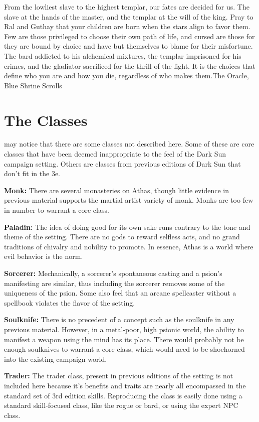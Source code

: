{From the lowliest slave to the highest templar, our fates are decided for us. The slave at the hands of the master, and the templar at the will of the king. Pray to Ral and Guthay that your children are born when the stars align to favor them. Few are those privileged to choose their own path of life, and cursed are those for they are bound by choice and have but themselves to blame for their misfortune. The bard addicted to his alchemical mixtures, the templar imprisoned for his crimes, and the gladiator sacrificed for the thrill of the fight. It is the choices that define who you are and how you die, regardless of who makes them.}{The Oracle, Blue Shrine Scrolls}

\section{The Classes}
 may notice that there are some classes not described here. Some of these are core classes that have been deemed inappropriate to the feel of the {\tableheader Dark Sun} campaign setting. Others are classes from previous editions of {\tableheader Dark Sun} that don't fit in the 3e.

\textbf{Monk:} There are several monasteries on Athas, though little evidence in previous material supports the martial artist variety of monk. Monks are too few in number to warrant a core class.

\textbf{Paladin:} The idea of doing good for its own sake runs contrary to the tone and theme of the setting. There are no gods to reward selfless acts, and no grand traditions of chivalry and nobility to promote. In essence, Athas is a world where evil behavior is the norm.

\textbf{Sorcerer:} Mechanically, a sorcerer's spontaneous casting and a psion's manifesting are similar, thus including the sorcerer removes some of the uniqueness of the psion. Some also feel that an arcane spellcaster without a spellbook violates the flavor of the setting.

\textbf{Soulknife:} There is no precedent of a concept such as the soulknife in any previous material. However, in a metal-poor, high psionic world, the ability to manifest a weapon using the mind has its place. There would probably not be enough soulknives to warrant a core class, which would need to be shoehorned into the existing campaign world.

\textbf{Trader:} The trader class, present in previous editions of the setting is not included here because it's benefits and traits are nearly all encompassed in the standard set of 3rd edition skills. Reproducing the class is easily done using a standard skill-focused class, like the rogue or bard, or using the expert NPC class.

